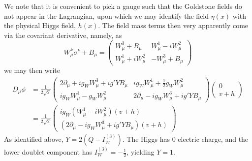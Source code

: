 We note that it is convenient  to pick a gauge such that the Goldstone fields
do not appear in the Lagrangian, upon which we may identify the field $\eta(x)$ with the physical 
Higgs field, $h(x)$. The field mass terms then very apparently come via the covariant derivative, namely,
as 
\begin{equation}
W_{\mu}^{k}\sigma^{k}+B_{\mu} =
\begin{pmatrix}W_{\mu}^3+B_{\mu} & W_{\mu}^1-iW_{\mu}^2\\W_{\mu}^1+iW_{\mu}^2 & -W_{\mu}^3+B_{\mu}\end{pmatrix}
\end{equation}
we may then write
\begin{align}
D_{\mu}\phi &= 
\frac{1}{2\sqrt{2}}\begin{pmatrix}
2\partial_{\mu}+ig_{W}W_{\mu}^3+ig'YB_{\mu} & 
ig_{W}W_{\mu}^1+\frac{1}{2}g_{W}W_{\mu}^2\\
ig_{W}W_{\mu}^1-g_{W}W_{\mu}^2 &
2\partial_{\mu}-ig_{W}W_{\mu}^3+ig'YB_{\mu}\end{pmatrix}\begin{pmatrix}0\\ v+h\end{pmatrix}\\
&=\frac{1}{2\sqrt{2}}
\begin{pmatrix}
ig_{W}(W_{\mu}^1-iW_{\mu}^2)(v+h)\\
(2\partial_{\mu}-ig_{W}W_{\mu}^3+ig'YB_{\mu})(v+h)
 \end{pmatrix}
\end{align}
As identified above, $Y = 2(Q-I_{W}^{(3)})$. The Higgs has $0$ electric charge, and the lower 
doublet component has $I_{W}^{(3)} = -\frac{1}{2}$, yielding $Y=1$.

